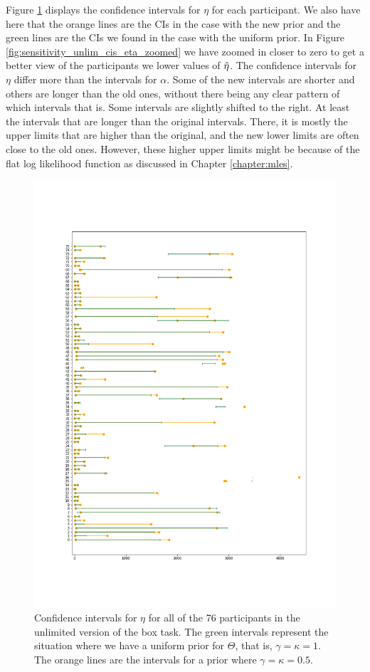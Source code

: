 Figure \ref{fig:sensitivity_unlim_cis_eta} displays the confidence intervals for $\eta$ for each participant. We also have here that the orange lines are the CIs in the case with the new prior and the green lines are the CIs we found in the case with the uniform prior. In Figure \ref{fig:sensitivity_unlim_cis_eta_zoomed} we have zoomed in closer to zero to get a better view of the participants we lower values of $\hat{\eta}$. The confidence intervals for $\eta$ differ more than the intervals for $\alpha$. 
Some of the new intervals are shorter and others are longer than the old ones, without there being any clear pattern of which intervals that is. Some intervals are slightly shifted to the right. At least the intervals that are longer than the original intervals. There, it is mostly the upper limits that are higher than the original, and the new lower limits are often close to the old ones. 
However, these higher upper limits might be because of the flat log likelihood function as discussed in Chapter \ref{chapter:mles}. 
\begin{figure}
    \centering
    \includegraphics[scale=0.36]{pictures/Sensitivity/ci_unlim_eta.png}
    \caption[CIs for $\eta$ for all participants with two different priors, unlimited]{
    Confidence intervals for $\eta$ for all of the 76 participants in the unlimited version of the box task. The green intervals represent the situation where we have a uniform prior for $\Theta$, that is, $\gamma=\kappa=1$. The orange lines are the intervals for a prior where $\gamma=\kappa=0.5$.}
    \label{fig:sensitivity_unlim_cis_eta}
\end{figure}
